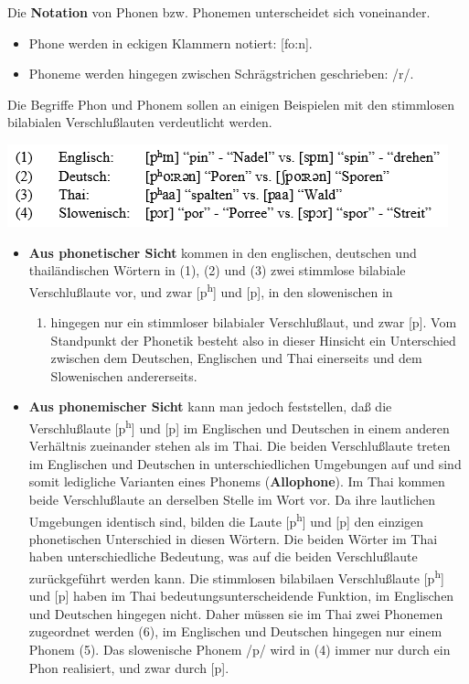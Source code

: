 \documentclass[
]{article}
\providecommand{\tightlist}{%
  \setlength{\itemsep}{0pt}\setlength{\parskip}{0pt}}
\begin{document}
Die \textbf{Notation} von Phonen bzw. Phonemen unterscheidet sich
voneinander.

\begin{itemize}
\item
  Phone werden in eckigen Klammern notiert: {[}fo:n{]}.
\item
  Phoneme werden hingegen zwischen Schrägstrichen geschrieben: /r/.
\end{itemize}

Die Begriffe Phon und Phonem sollen an einigen Beispielen mit den
stimmlosen bilabialen Verschlußlauten verdeutlicht werden.

\includegraphics[width=0.6\linewidth]{pictures/01b_NSG_Intro_2020-10-07/phoneme_und_allophone1}

\begin{itemize}
\tightlist
\item
  \textbf{Aus phonetischer Sicht} kommen in den englischen, deutschen und
  thailändischen Wörtern in (1), (2) und (3) zwei stimmlose bilabiale
  Verschlußlaute vor, und zwar {[}p\textsuperscript{h}{]} und {[}p{]}, in den slowenischen in

  \begin{enumerate}
  \def\labelenumi{(\arabic{enumi})}
  \setcounter{enumi}{3}
  \tightlist
  \item
    hingegen nur ein stimmloser bilabialer Verschlußlaut, und zwar
    {[}p{]}. Vom Standpunkt der Phonetik besteht also in dieser Hinsicht ein
    Unterschied zwischen dem Deutschen, Englischen und Thai einerseits
    und dem Slowenischen andererseits.
  \end{enumerate}
\item
  \textbf{Aus phonemischer Sicht} kann man jedoch feststellen, daß die
  Verschlußlaute {[}p\textsuperscript{h}{]} und {[}p{]} im Englischen und Deutschen in einem
  anderen Verhältnis zueinander stehen als im Thai. Die beiden
  Verschlußlaute treten im Englischen und Deutschen in
  unterschiedlichen Umgebungen auf und sind somit ledigliche Varianten
  eines Phonems (\textbf{Allophone}). Im Thai kommen beide Verschlußlaute
  an derselben Stelle im Wort vor. Da ihre lautlichen Umgebungen
  identisch sind, bilden die Laute {[}p\textsuperscript{h}{]} und {[}p{]} den einzigen
  phonetischen Unterschied in diesen Wörtern. Die beiden Wörter im
  Thai haben unterschiedliche Bedeutung, was auf die beiden
  Verschlußlaute zurückgeführt werden kann. Die stimmlosen bilabilaen
  Verschlußlaute {[}p\textsuperscript{h}{]} und {[}p{]} haben im Thai
  bedeutungsunterscheidende Funktion, im Englischen und Deutschen
  hingegen nicht. Daher müssen sie im Thai zwei Phonemen zugeordnet
  werden (6), im Englischen und Deutschen hingegen nur einem Phonem
  (5). Das slowenische Phonem /p/ wird in (4) immer nur durch ein Phon
  realisiert, und zwar durch {[}p{]}.
\end{itemize}
\end{document}
